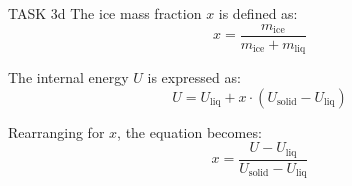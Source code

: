 TASK 3d  
The ice mass fraction \( x \) is defined as:  
\[
x = \frac{m_{\text{ice}}}{m_{\text{ice}} + m_{\text{liq}}}
\]

The internal energy \( U \) is expressed as:  
\[
U = U_{\text{liq}} + x \cdot (U_{\text{solid}} - U_{\text{liq}})
\]

Rearranging for \( x \), the equation becomes:  
\[
x = \frac{U - U_{\text{liq}}}{U_{\text{solid}} - U_{\text{liq}}}
\]
